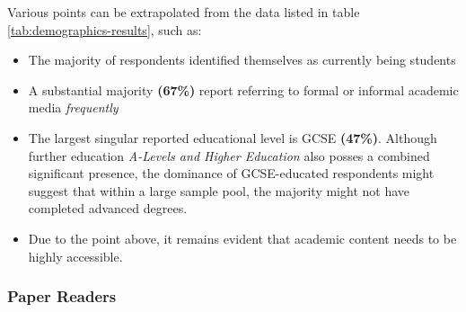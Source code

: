 Various points can be extrapolated from the data listed in table \ref{tab:demographics-results}, such as:

\begin{itemize}
    \item The majority of respondents identified themselves as currently being students
    \item A substantial majority \textbf{(67\%)} report referring to formal or informal academic media \textit{frequently}
    \item The largest singular reported educational level is GCSE \textbf{(47\%)}. Although further education \textit{A-Levels and Higher Education} also posses a combined significant presence,
          the dominance of GCSE-educated respondents might suggest that within a large sample pool, the majority might not have completed advanced degrees.
    \item Due to the point above, it remains evident that academic content needs to be highly accessible.
\end{itemize}

\subsubsection*{Paper Readers}

\small
\renewcommand{\arraystretch}{1.2}

